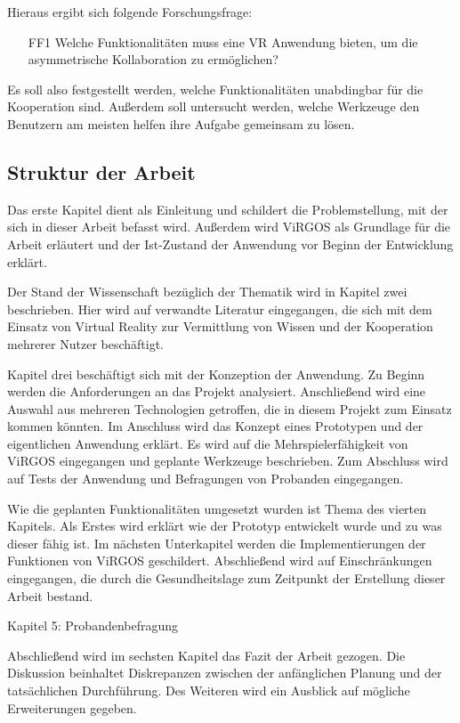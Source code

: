Hieraus ergibt sich folgende Forschungsfrage:

\begin{itemize}
\item[FF1] \label{FF1} Welche Funktionalitäten muss eine VR Anwendung bieten, um die asymmetrische Kollaboration zu ermöglichen?
\end{itemize}

Es soll also festgestellt werden, welche Funktionalitäten unabdingbar für die Kooperation sind. Außerdem soll untersucht werden, welche Werkzeuge den Benutzern am meisten helfen ihre Aufgabe gemeinsam zu lösen.


\subsection{Struktur der Arbeit}
Das erste Kapitel dient als Einleitung und schildert die Problemstellung, mit der sich in dieser Arbeit befasst wird. Außerdem wird ViRGOS als Grundlage für die Arbeit erläutert und der Ist-Zustand der Anwendung vor Beginn der Entwicklung erklärt. \newline

Der Stand der Wissenschaft bezüglich der Thematik wird in Kapitel zwei beschrieben. Hier wird auf verwandte Literatur eingegangen, die sich mit dem Einsatz von Virtual Reality zur Vermittlung von Wissen und der Kooperation mehrerer Nutzer beschäftigt. \newline

Kapitel drei beschäftigt sich mit der Konzeption der Anwendung. Zu Beginn werden die Anforderungen an das Projekt analysiert. Anschließend wird eine Auswahl aus mehreren Technologien getroffen, die in diesem Projekt zum Einsatz kommen könnten. Im Anschluss wird das Konzept eines Prototypen und der eigentlichen Anwendung erklärt. Es wird auf die Mehrspielerfähigkeit von ViRGOS eingegangen und geplante Werkzeuge beschrieben. Zum Abschluss wird auf Tests der Anwendung und Befragungen von Probanden eingegangen. \newline

Wie die geplanten Funktionalitäten umgesetzt wurden ist Thema des vierten Kapitels. Als Erstes wird erklärt wie der Prototyp entwickelt wurde und zu was dieser fähig ist. Im nächsten Unterkapitel werden die Implementierungen der Funktionen von ViRGOS geschildert. Abschließend wird auf Einschränkungen eingegangen, die durch die Gesundheitslage zum Zeitpunkt der Erstellung dieser Arbeit bestand. \newline

Kapitel 5: Probandenbefragung  \newline

Abschließend wird im sechsten Kapitel das Fazit der Arbeit gezogen. Die Diskussion beinhaltet Diskrepanzen zwischen der anfänglichen Planung und der tatsächlichen Durchführung. Des Weiteren wird ein Ausblick auf mögliche Erweiterungen gegeben.
